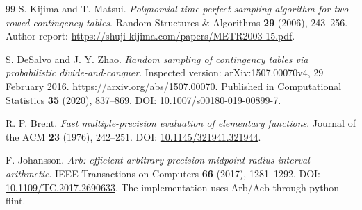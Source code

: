 \documentclass[11pt,a4paper]{article}
\theoremstyle{definition}
\begin{document}
\begin{thebibliography}{99}
 S. Kijima and T. Matsui. \emph{Polynomial time perfect sampling algorithm for two-rowed contingency tables}. Random Structures \& Algorithms \textbf{29} (2006), 243--256. Author report: \url{https://shuji-kijima.com/papers/METR2003-15.pdf}.

 S. DeSalvo and J. Y. Zhao. \emph{Random sampling of contingency tables via probabilistic divide-and-conquer}. Inspected version: arXiv:1507.00070v4, 29 February 2016. \url{https://arxiv.org/abs/1507.00070}. Published in Computational Statistics \textbf{35} (2020), 837--869. DOI: \href{https://doi.org/10.1007/s00180-019-00899-7}{10.1007/s00180-019-00899-7}.

 R. P. Brent. \emph{Fast multiple-precision evaluation of elementary functions}. Journal of the ACM \textbf{23} (1976), 242--251. DOI: \href{https://doi.org/10.1145/321941.321944}{10.1145/321941.321944}.

 F. Johansson. \emph{Arb: efficient arbitrary-precision midpoint-radius interval arithmetic}. IEEE Transactions on Computers \textbf{66} (2017), 1281--1292. DOI: \href{https://doi.org/10.1109/TC.2017.2690633}{10.1109/TC.2017.2690633}. The implementation uses Arb/Acb through python-flint.
\end{thebibliography}
\end{document}
